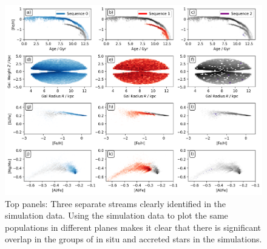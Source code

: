 \documentclass[fleqn,usenatbib]{mnras}
\begin{document}
\begin{figure}
	\includegraphics[width=\textwidth]{figures/AlFe_MgMn_selection_Age_FeH_dissection_sim.png}
    \caption{Top panels: Three separate streams clearly identified in the simulation data. Using the simulation data to plot the same populations in different planes makes it clear that there is significant overlap in the groups of in situ and accreted stars in the simulations.}
    \label{fig:AlFe_MgMn_selection_Age_FeH_dissection_sim}
\end{figure}
\end{document}
